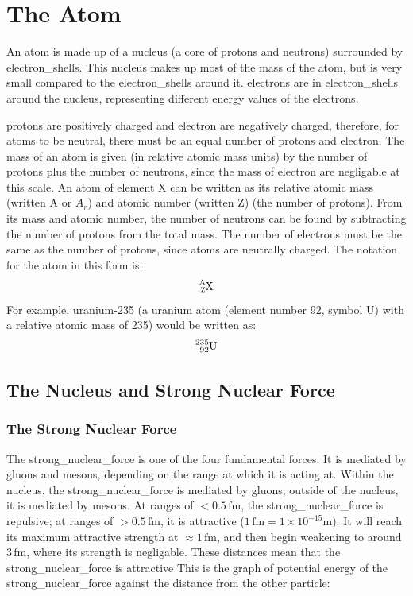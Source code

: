 \section{The Atom}
    An \gls{atom} is made up of a \gls{nucleus} (a core of \glspl{proton} and \glspl{neutron}) surrounded by \glspl{electron_shell}.
    This \gls{nucleus} makes up most of the mass of the \gls{atom}, but is very small compared to the \glspl{electron_shell} around it.
    \Glspl{electron} are in \glspl{electron_shell} around the \gls{nucleus}, representing different energy values of the \glspl{electron}.

    \Glspl{proton} are positively charged and \gls{electron} are negatively charged, therefore, for \glspl{atom} to be neutral, there must be an equal number of \glspl{proton} and \gls{electron}.
    The mass of an \gls{atom} is given (in relative atomic mass units) by the number of \glspl{proton} plus the number of \glspl{neutron}, since the mass of \gls{electron} are negligable at this scale.
    An atom of element X can be written as its relative atomic mass (written A or $A_r$) and atomic number (written Z) (the number of \glspl{proton}).
    From its mass and atomic number, the number of \glspl{neutron} can be found by subtracting the number of \glspl{proton} from the total mass.
    The number of \glspl{electron} must be the same as the number of \glspl{proton}, since atoms are neutrally charged.
    The notation for the \gls{atom} in this form is:
    \begin{equation}
        \ce{_Z^AX}
    \end{equation}
    For example, uranium-235 (a uranium \gls{atom} (element number 92, symbol U) with a relative atomic mass of 235) would be written as:
    \begin{equation}
        \ce{^{235}_{92}U}
    \end{equation}

    \subsection{The Nucleus and Strong Nuclear Force}
        \subsubsection{The Strong Nuclear Force}
            The \gls{strong_nuclear_force} is one of the four fundamental forces.
            It is mediated by \glspl{gluon} and \glspl{meson}, depending on the range at which it is acting at.
            Within the \gls{nucleus}, the \gls{strong_nuclear_force} is mediated by \glspl{gluon}; outside of the \gls{nucleus}, it is mediated by \glspl{meson}.
            At ranges of $<0.5\,\text{fm}$, the \gls{strong_nuclear_force} is repulsive; at ranges of $>0.5\,\text{fm}$, it is attractive ($1\,\text{fm}=1\times10^{-15}\text{m}$).
            It will reach its maximum attractive strength at $\approx1\,\text{fm}$, and then begin weakening to around $3\,\text{fm}$, where its strength is negligable.
            These distances mean that the \gls{strong_nuclear_force} is attractive 
            This is the graph of potential energy of the \gls{strong_nuclear_force} against the distance from the other particle:

